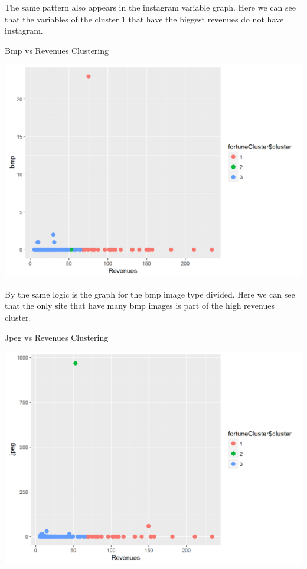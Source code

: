 \documentclass{article}
\begin{document}
The same pattern also appears in the instagram variable graph. Here we can see that the variables of the cluster 1 that have the biggest revenues do not have instagram.
\begin{table}[H]
\centering
\caption{Bmp vs Revenues Clustering}
\begin{center}
\includegraphics[scale=0.5]{../R/photos/94_clust_bmp.png}   \\
\end{center}
\end{table}
By the same logic is the graph for the bmp image type divided. Here we can see that the only site that have many bmp images is part of the high revenues cluster.
\begin{table}[H]
\centering
\caption{Jpeg vs Revenues Clustering}
\begin{center}
\includegraphics[scale=0.5]{../R/photos/95_clust_jpe.png}   \\
\end{center}
\end{table}
\end{document}
